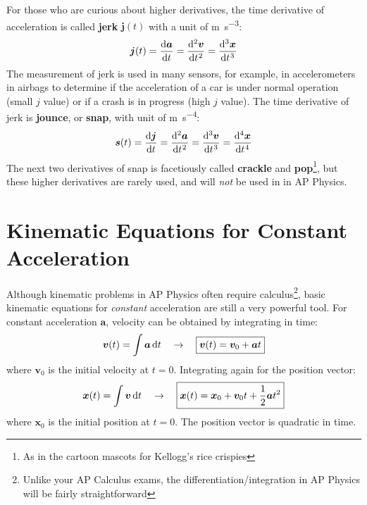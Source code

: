 \documentclass{../../oss-handout}
\begin{document}
For those who are curious about higher derivatives, the time derivative of
acceleration is called \textbf{jerk} $\bm{j}(t)$ with a unit of
\si{\metre\per\second\cubed}:
\begin{equation}
  \bm j(t)=\diff{\bm a}t=\diff[2]{\bm v}t=\diff[3]{\bm x}t
\end{equation}
The measurement of jerk is used in many sensors, for example, in accelerometers
in airbags to determine if the acceleration of a car is under normal operation
(small $j$ value) or if a crash is in progress (high $j$ value). The time
derivative of jerk is \textbf{jounce}, or \textbf{snap}, with unit of
\si{\metre\per\second^4}:
\begin{equation}
  \bm s(t)=\diff{\bm j}t=\diff[2]{\bm a}t=\diff[3]{\bm v}t=\diff[4]{\bm x}t
\end{equation}
The next two derivatives of snap is facetiously called \textbf{crackle} and
\textbf{pop}\footnote{As in the cartoon mascots for Kellogg's rice crispies},
but these higher derivatives are rarely used, and will \emph{not} be used in
in AP Physics.



\section{Kinematic Equations for Constant Acceleration}

Although kinematic problems in AP Physics often require calculus\footnote{Unlike
  your AP Calculus exams, the differentiation/integration in AP Physics will be
  fairly straightforward}, basic kinematic equations for \emph{constant}
acceleration are still a very powerful tool. For constant acceleration
$\bm a$, velocity can be obtained by integrating in time:
\begin{equation}
  \bm v(t)=\int\bm a\dl t\quad\rightarrow\quad
  \boxed{\bm v(t)=\bm v_0+\bm at}
  \label{eq:big5-1}
\end{equation}
where $\bm v_0$ is the initial velocity at $t=0$. Integrating again for the
position vector:
\begin{equation}
  \bm x(t)=\int \bm v\dl t\quad\rightarrow\quad
  \boxed{\bm x(t)=\bm x_0+\bm v_0t+\frac12 \bm at^2}
  \label{eq:big5-2}
\end{equation}
where $\bm x_0$ is the initial position at $t=0$. The position vector is
quadratic in time.
\end{document}
